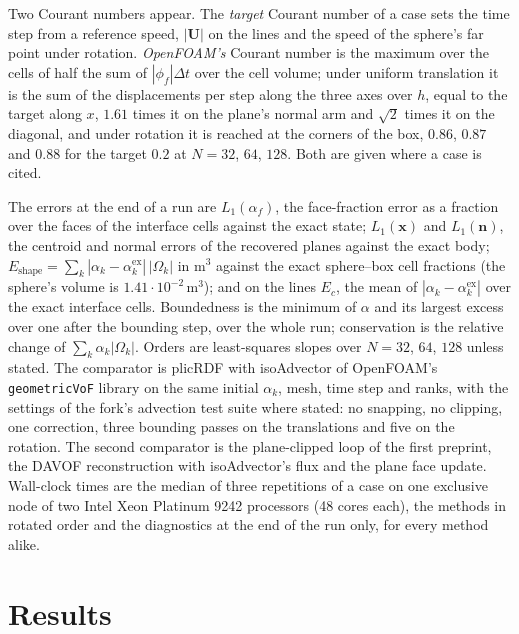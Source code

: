 \documentclass[preprint,12pt]{elsarticle}
\begin{document}
Two Courant numbers appear. The \emph{target} Courant number of a case sets the time step from a reference speed, $|\mathbf{U}|$ on the lines and the speed of the sphere's far point under rotation. \emph{OpenFOAM's} Courant number is the maximum over the cells of half the sum of $|\phi_f|\Delta t$ over the cell volume; under uniform translation it is the sum of the displacements per step along the three axes over $h$, equal to the target along $x$, $1.61$ times it on the plane's normal arm and $\sqrt{2}$ times it on the diagonal, and under rotation it is reached at the corners of the box, $0.86$, $0.87$ and $0.88$ for the target $0.2$ at $N = 32$, $64$, $128$. Both are given where a case is cited.

The errors at the end of a run are $L_1(\alpha_f)$, the face-fraction error as a fraction over the faces of the interface cells against the exact state; $L_1(\mathbf{x})$ and $L_1(\mathbf{n})$, the centroid and normal errors of the recovered planes against the exact body; $E_{\mathrm{shape}} = \sum_k|\alpha_k - \alpha_k^{\mathrm{ex}}|\,|\Omega_k|$ in $\mathrm{m^3}$ against the exact sphere--box cell fractions (the sphere's volume is $1.41\cdot10^{-2}\,\mathrm{m^3}$); and on the lines $E_c$, the mean of $|\alpha_k - \alpha_k^{\mathrm{ex}}|$ over the exact interface cells. Boundedness is the minimum of $\alpha$ and its largest excess over one after the bounding step, over the whole run; conservation is the relative change of $\sum_k \alpha_k|\Omega_k|$. Orders are least-squares slopes over $N = 32$, $64$, $128$ unless stated. The comparator is plicRDF with isoAdvector of OpenFOAM's \texttt{geometricVoF} library \citep{ScheuflerRoenby2019,ScheuflerRoenby2023TwoPhaseFlow} on the same initial $\alpha_k$, mesh, time step and ranks, with the settings of the fork's advection test suite where stated: no snapping, no clipping, one correction, three bounding passes on the translations and five on the rotation. The second comparator is the plane-clipped loop of the first preprint, the DAVOF reconstruction with isoAdvector's flux and the plane face update. Wall-clock times are the median of three repetitions of a case on one exclusive node of two Intel Xeon Platinum 9242 processors (48 cores each), the methods in rotated order and the diagnostics at the end of the run only, for every method alike.

\section{Results}
\label{sec:results}
\end{document}
